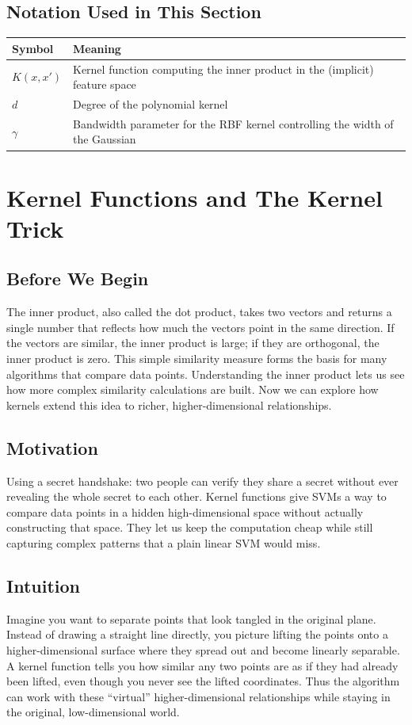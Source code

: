 \documentclass[12pt, a4paper]{article}
\begin{document}
\subsection*{Notation Used in This Section}
\begin{tabular}{@{}ll@{}}
\toprule
Symbol & Meaning \\ \midrule
    $K(x, x')$ & Kernel function computing the inner product in the (implicit) feature space \\
    $d$ & Degree of the polynomial kernel \\
    $\gamma$ & Bandwidth parameter for the RBF kernel controlling the width of the Gaussian \\
\bottomrule
\end{tabular}
\vspace{1em}

\section{Kernel Functions and The Kernel Trick}

\subsection{Before We Begin}
The inner product, also called the dot product, takes two vectors and returns a single number that reflects how much the vectors point in the same direction.  
If the vectors are similar, the inner product is large; if they are orthogonal, the inner product is zero.  
This simple similarity measure forms the basis for many algorithms that compare data points.  
Understanding the inner product lets us see how more complex similarity calculations are built.  
Now we can explore how kernels extend this idea to richer, higher-dimensional relationships.

\subsection{Motivation}
Using a secret handshake: two people can verify they share a secret without ever revealing the whole secret to each other.  
Kernel functions give SVMs a way to compare data points in a hidden high-dimensional space without actually constructing that space.  
They let us keep the computation cheap while still capturing complex patterns that a plain linear SVM would miss.  

\subsection{Intuition}
Imagine you want to separate points that look tangled in the original plane.  
Instead of drawing a straight line directly, you picture lifting the points onto a higher-dimensional surface where they spread out and become linearly separable.  
A kernel function tells you how similar any two points are as if they had already been lifted, even though you never see the lifted coordinates.  
Thus the algorithm can work with these ``virtual'' higher-dimensional relationships while staying in the original, low-dimensional world.
\end{document}
